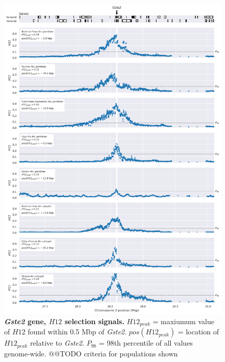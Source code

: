 \documentclass[a4paper,11pt,abstracton,hidelinks]{scrartcl}
\begin{document}
\begin{figure}[t!]
	\begin{center}
		\includegraphics*[width=1\linewidth,center]{artwork/locus_gste2_h12_pdist.png}
	\end{center}
	\caption[\textit{Gste2} gene, $H12$ selection signals]{
	\textbf{\textit{Gste2} gene, $H12$ selection signals.}
	$H12_{peak}$ = maxiumum value of $H12$ found within 0.5 Mbp of \textit{Gste2}. 
	$pos(H12_{peak})$ = location of $H12_{peak}$ relative to \textit{Gste2}.
	$P_{98}$ = 98th percentile of all values genome-wide.
	@@TODO criteria for populations shown
	} 
	\label{fig:locus_gste2_h12}
\end{figure}


\clearpage
\end{document}

